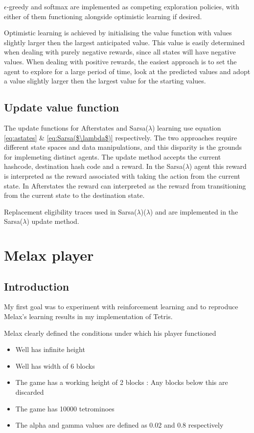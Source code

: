 \documentclass{rucsthesis}
\begin{document}
$\epsilon$-greedy and softmax are implemented as competing exploration policies, with either of them functioning alongside optimistic learning if desired. 

Optimistic learning is achieved by initialising the value function with values slightly larger then the largest anticipated value. This value is easily determined when dealing with purely negative rewards, since all states will have negative values. When dealing with positive rewards, the easiest approach is to set the agent to explore for a large period of time, look at the predicted values and adopt a value slightly larger then the largest value for the starting values.

\section{Update value function}

The update functions for Afterstates and Sarsa($\lambda$) learning use equation \ref{eq:astates} \& \ref{eq:Sarsa($\lambda$)} respectively. The two approaches require different state spaces and data manipulations, and this disparity is the grounds for implemeting distinct agents. The update method accepts the current hashcode, destination hash code and a reward. In the Sarsa($\lambda$) agent this reward is interpreted as the reward associated with taking the action from the current state. In Afterstates the reward can interpreted as the reward from transitioning from the current state to the destination state. 


Replacement eligibility traces used in Sarsa($\lambda$)($\lambda$) and are implemented in the Sarsa($\lambda$) update method. 

\chapter{Melax player}

\section{Introduction}

My first goal was to experiment with reinforcement learning and to reproduce Melax's learning results in my implementation of Tetris.  

Melax clearly defined the conditions under which his player functioned

\begin{itemize}
\item{Well has infinite height}
\item{Well has width of 6 blocks}
\item{The game has a working height of 2 blocks : Any blocks below this are discarded}
\item{The game has 10000 tetrominoes}
\item{The alpha and gamma values are defined as 0.02 and 0.8 respectively}
\end{itemize}
\end{document}

